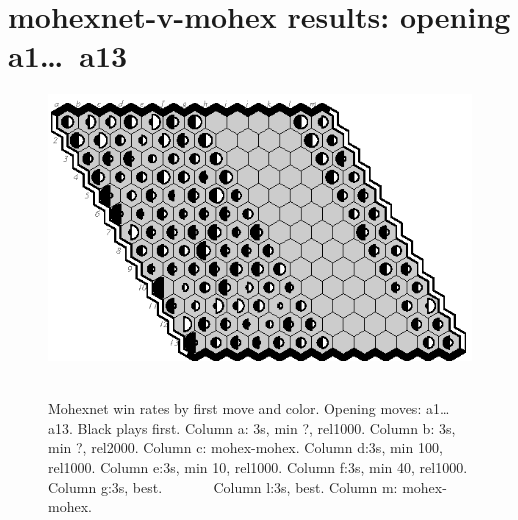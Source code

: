 \documentclass{article}
\begin{document}
\section*{mohexnet-v-mohex results: opening a1\ldots\ a13}
\begin{figure}[hb]
\includegraphics[scale=2]{data/pix2/mnt-mx.eps}\vfill\vfill\vfill~
\caption{Mohexnet win rates by first move and color. Opening moves: a1\ldots a13. Black plays first. 
Column a: 3s, min ?, rel1000.
Column b: 3s, min ?, rel2000. 
Column c: mohex-mohex. 
Column d:3s, min 100, rel1000.
Column e:3s, min 10, rel1000. 
Column f:3s, min 40, rel1000.
Column g:3s, best. ~ ~ ~ ~ 
Column l:3s, best.
Column m: mohex-mohex.}
\end{figure}
\end{document}
